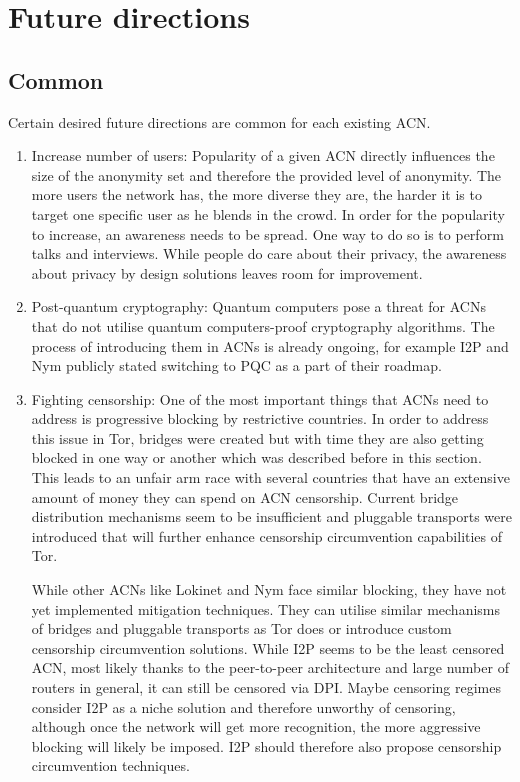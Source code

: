 \chapter{Future directions}

\section{Common}
Certain desired future directions are common for each existing ACN.
\begin{enumerate}
    \item Increase number of users: Popularity of a given ACN directly influences the size of the anonymity set and therefore the provided level of anonymity. The more users the network has, the more diverse they are, the harder it is to target one specific user as he blends in the crowd. In order for the popularity to increase, an awareness needs to be spread. One way to do so is to perform talks and interviews. While people do care about their privacy, the awareness about privacy by design solutions leaves room for improvement.
    \item Post-quantum cryptography: Quantum computers pose a threat for ACNs that do not utilise quantum computers-proof cryptography algorithms. The process of introducing them in ACNs is already ongoing, for example I2P and Nym publicly stated switching to PQC as a part of their roadmap.
    \item Fighting censorship: One of the most important things that ACNs need to address is progressive blocking by restrictive countries. In order to address this issue in Tor, bridges were created but with time they are also getting blocked in one way or another which was described before in this section. This leads to an unfair arm race with several countries that have an extensive amount of money they can spend on ACN censorship. Current bridge distribution mechanisms seem to be insufficient and pluggable transports were introduced that will further enhance censorship circumvention capabilities of Tor.
    
    While other ACNs like Lokinet and Nym face similar blocking, they have not yet implemented mitigation techniques. They can utilise similar mechanisms of bridges and pluggable transports as Tor does or introduce custom censorship circumvention solutions. While I2P seems to be the least censored ACN, most likely thanks to the peer-to-peer architecture and large number of routers in general, it can still be censored via DPI. Maybe censoring regimes consider I2P as a niche solution and therefore unworthy of censoring, although once the network will get more recognition, the more aggressive blocking will likely be imposed. I2P should therefore also propose censorship circumvention techniques.
\end{enumerate}

